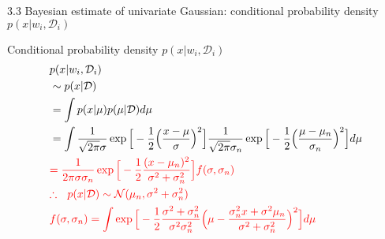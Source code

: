 \documentclass[compress,blue]{beamer}
\newcommand{\calD}{\mathcal{D}}
\begin{document}
\begin{frame}{3.3 Bayesian estimate of univariate Gaussian: conditional probability density $p(x | w_i, \calD_i)$}
	\begin{block}{Conditional probability density $p(x | w_i, \calD_i)$}
		\small
		\begin{align}
			& p(x|w_i, \calD_i) \\
			&\sim p(x | \calD) \\
			& = \int p(x|\mu) p(\mu | \calD) d\mu \\
			& = \int \frac{1}{\sqrt{2\pi}\sigma}\exp\Big[-\frac{1}{2}\Big(\frac{x-\mu}{\sigma}\Big)^2\Big]\frac{1}{\sqrt{2\pi}\sigma_n}\exp\Big[-\frac{1}{2}\Big(\frac{\mu-\mu_n}{\sigma_n}\Big)^2\Big]d\mu \nonumber\\
			& \textcolor{red}{= \frac{1}{2\pi\sigma\sigma_n}\exp\Big[-\frac{1}{2}\frac{(x-\mu_n)^2}{\sigma^2+\sigma^2_n}\Big]f(\sigma, \sigma_n)}\\
			& \textcolor{red}{\therefore ~~ p(x | \calD) \sim \mathcal{N}(\mu_n, \sigma^2+\sigma^2_n)}\\
			& \textcolor{red}{f(\sigma, \sigma_n) = \int \exp\Big[-\frac{1}{2}\frac{\sigma^2 + \sigma_n^2}{\sigma^2\sigma_n^2}\Big(\mu - \frac{\sigma^2_n x + \sigma^2\mu_n}{\sigma^2 + \sigma^2_n}\Big)^2\Big]d\mu}
		\end{align}
		\normalsize
	\end{block}
\end{frame}
\end{document}
